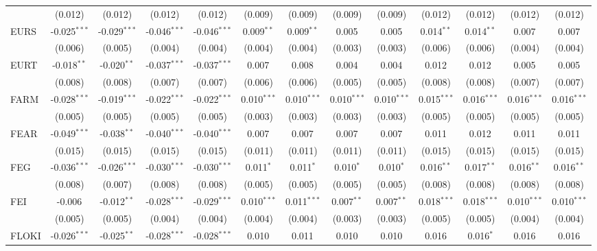 \begin{table}[!htbp]
\begin{tabular}{@{\extracolsep{5pt}}lcccccccccccc}
  & (0.012) & (0.012) & (0.012) & (0.012) & (0.009) & (0.009) & (0.009) & (0.009) & (0.012) & (0.012) & (0.012) & (0.012) \\
 EURS & -0.025$^{***}$ & -0.029$^{***}$ & -0.046$^{***}$ & -0.046$^{***}$ & 0.009$^{**}$ & 0.009$^{**}$ & 0.005$^{}$ & 0.005$^{}$ & 0.014$^{**}$ & 0.014$^{**}$ & 0.007$^{}$ & 0.007$^{}$ \\
  & (0.006) & (0.005) & (0.004) & (0.004) & (0.004) & (0.004) & (0.003) & (0.003) & (0.006) & (0.006) & (0.004) & (0.004) \\
 EURT & -0.018$^{**}$ & -0.020$^{**}$ & -0.037$^{***}$ & -0.037$^{***}$ & 0.007$^{}$ & 0.008$^{}$ & 0.004$^{}$ & 0.004$^{}$ & 0.012$^{}$ & 0.012$^{}$ & 0.005$^{}$ & 0.005$^{}$ \\
  & (0.008) & (0.008) & (0.007) & (0.007) & (0.006) & (0.006) & (0.005) & (0.005) & (0.008) & (0.008) & (0.007) & (0.007) \\
 FARM & -0.028$^{***}$ & -0.019$^{***}$ & -0.022$^{***}$ & -0.022$^{***}$ & 0.010$^{***}$ & 0.010$^{***}$ & 0.010$^{***}$ & 0.010$^{***}$ & 0.015$^{***}$ & 0.016$^{***}$ & 0.016$^{***}$ & 0.016$^{***}$ \\
  & (0.005) & (0.005) & (0.005) & (0.005) & (0.003) & (0.003) & (0.003) & (0.003) & (0.005) & (0.005) & (0.005) & (0.005) \\
 FEAR & -0.049$^{***}$ & -0.038$^{**}$ & -0.040$^{***}$ & -0.040$^{***}$ & 0.007$^{}$ & 0.007$^{}$ & 0.007$^{}$ & 0.007$^{}$ & 0.011$^{}$ & 0.012$^{}$ & 0.011$^{}$ & 0.011$^{}$ \\
  & (0.015) & (0.015) & (0.015) & (0.015) & (0.011) & (0.011) & (0.011) & (0.011) & (0.015) & (0.015) & (0.015) & (0.015) \\
 FEG & -0.036$^{***}$ & -0.026$^{***}$ & -0.030$^{***}$ & -0.030$^{***}$ & 0.011$^{*}$ & 0.011$^{*}$ & 0.010$^{*}$ & 0.010$^{*}$ & 0.016$^{**}$ & 0.017$^{**}$ & 0.016$^{**}$ & 0.016$^{**}$ \\
  & (0.008) & (0.007) & (0.008) & (0.008) & (0.005) & (0.005) & (0.005) & (0.005) & (0.008) & (0.008) & (0.008) & (0.008) \\
 FEI & -0.006$^{}$ & -0.012$^{**}$ & -0.028$^{***}$ & -0.029$^{***}$ & 0.010$^{***}$ & 0.011$^{***}$ & 0.007$^{**}$ & 0.007$^{**}$ & 0.018$^{***}$ & 0.018$^{***}$ & 0.010$^{***}$ & 0.010$^{***}$ \\
  & (0.005) & (0.005) & (0.004) & (0.004) & (0.004) & (0.004) & (0.003) & (0.003) & (0.005) & (0.005) & (0.004) & (0.004) \\
 FLOKI & -0.026$^{***}$ & -0.025$^{**}$ & -0.028$^{***}$ & -0.028$^{***}$ & 0.010$^{}$ & 0.011$^{}$ & 0.010$^{}$ & 0.010$^{}$ & 0.016$^{}$ & 0.016$^{*}$ & 0.016$^{}$ & 0.016$^{}$ \\

\end{tabular}
\end{table}
